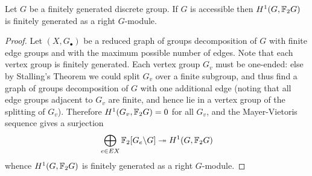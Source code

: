 \documentclass[draft, a4paper]{article}
\begin{document}
\begin{prop}
Let $G$ be a finitely generated discrete group. If $G$ is accessible then $H^1(G,\mathbb{F}_2G)$ is finitely generated as a right $G$-module.
\end{prop}
\begin{proof}
Let $(X,G_\bullet)$ be a reduced graph of groups decomposition of $G$ with finite edge groups and with the maximum possible number of edges. Note that each vertex group is finitely generated. Each vertex group $G_v$ must be one-ended: else by Stalling's Theorem \cite{Stallings70} we could split $G_v$ over a finite subgroup, and thus find a graph of groups decomposition of $G$ with one additional edge (noting that all edge groups adjacent to $G_v$ are finite, and hence lie in a vertex group of the splitting of $G_v$). Therefore $H^1(G_v,\mathbb{F}_2G)=0$ for all $G_v$, and the Mayer-Vietoris sequence gives a surjection 
\[\bigoplus_{e\in EX} \mathbb{F}_2[G_e\backslash G] \twoheadrightarrow H^1(G,\mathbb{F}_2G)\]
whence $H^1(G,\mathbb{F}_2G)$ is finitely generated as a right $G$-module. 
\end{proof}




\end{document}
